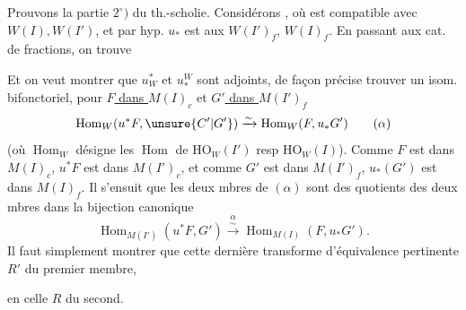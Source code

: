 Prouvons la partie $2^\circ)$ du th.-scholie. Considérons
,
où   est compatible avec $W(I),W(I')$, et par hyp. $u_*$ est  aux $W(I')_f$, $W(I)_f$. En passant aux cat. de fractions, on trouve

Et on veut montrer que $u_W^*$ et $u_*^W$ sont adjoints, de façon précise trouver un isom. bifonctoriel, pour \uline{$F$ dans $M(I)_c$} et \uline{$G'$ dans $M(I')_f$} 
\[
\operatorname{Hom}_W(u^*F,\unsure{C'|G'})\xrightarrow{\sim}\operatorname{Hom}_W(F,u_*G')
\tag*{($\alpha$)}
\]
(où $\operatorname{Hom}_W$ désigne les $\operatorname{Hom}$ de $\mathrm{HO}_W(I')$ resp $\mathrm{HO}_W(I)$). Comme $F$ est dans $M(I)_c$, $u^*F$ est dans $M(I')_c$, et comme $G'$ est dans $M(I')_f$, $u_*(G')$ est dans $M(I)_f$. Il s'ensuit que les deux mbres de $(\alpha)$ sont des quotients des deux mbres dans la bijection canonique
\[
\operatorname{Hom}_{M(I')}(u^*F,G')\overset{\alpha}{\xrightarrow{\sim}}\operatorname{Hom}_{M(I)}(F,u_*G').
\tag*{($\alpha\alpha$)}
\]
Il faut simplement montrer que cette dernière transforme  d'équivalence pertinente $R'$ du premier membre,

en celle $R$ du second.

